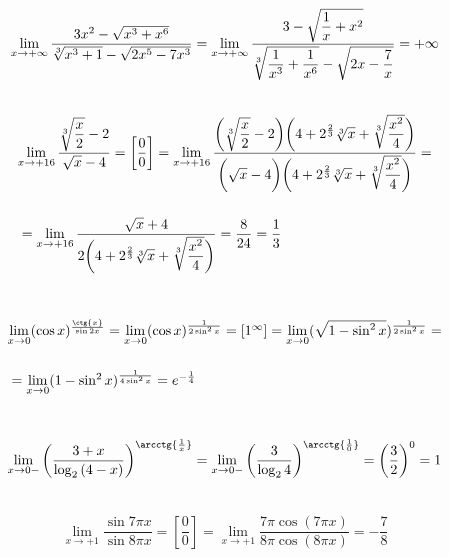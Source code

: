 \documentclass[12pt]{article}
\begin{document}
	\\
	$$
	\begin{array}{l}
		\lim\limits_{x\rightarrow+\infty} \dfrac{3x^2-\sqrt{x^3+x^6}}{\sqrt[3]{x^3+1}-\sqrt{2x^5-7x^3}}=\lim\limits_{x\rightarrow+\infty} \dfrac{3-\sqrt{\dfrac{1}{x}+x^2}}{\sqrt[3]{\dfrac{1}{x^3}+\dfrac{1}{x^6}}-\sqrt{2x-\dfrac{7}{x}}}=+\infty
		\\ \medskip{}{}
	\end{array}
	$$
	$$
	\begin{array}{l} 
		\lim\limits_{x\rightarrow+16} \dfrac{\sqrt[3]{\dfrac{x}{2}}-2}{\sqrt{x}-4} = \left[\dfrac{0}{0} \right]= \lim\limits_{x\rightarrow+16} \dfrac{\bigg(\sqrt[3]{\dfrac{x}{2}}-2 \bigg) \bigg(4+2^{\frac{2}{3}} \sqrt[3]{x}+\sqrt[3]{\dfrac{x^2}{4}}\bigg)}{\bigg(\sqrt{x}-4 \bigg) \bigg (4+2^{\frac{2}{3}} \sqrt[3]{x}+\sqrt[3]{\dfrac{x^2}{4}}\bigg )}=\\ \medskip{}{} \\ \medskip{}{} = \lim\limits_{x\rightarrow+16} \dfrac{\sqrt{x}+4}{2 \bigg (4+2^{\frac{2}{3}} \sqrt[3]{x}+\sqrt[3]{\dfrac{x^2}{4}} \bigg )}=\dfrac{8}{24}=\dfrac{1}{3}
	\end{array}
	$$
	\\
	$$
	\begin{array}{l}
		\lim\limits_{x\rightarrow0} (\cos{x})^{\frac{\ctg{x}}{\sin{2x}}}=\lim\limits_{x\rightarrow0} (\cos{x})^{\frac{1}{2\sin^2{x}}}=\left[1^{\infty}\right]=\lim\limits_{x\rightarrow0} (\sqrt{1-\sin^2{x}})^{\frac{1}{2\sin^2{x}}}=\\ \medskip{}{} \\ \medskip{}{}= \lim\limits_{x\rightarrow0} ({1-\sin^2{x}})^{\frac{1}{4\sin^2{x}}}=e^{-\frac{1}{4}}
	\end{array}
	$$
	\\
	$$
	\begin{array}{l}
		\lim\limits_{x\rightarrow0-} \left(\dfrac{3+x}{\log_2 {(4-x)}}\right)^{\arcctg{\frac{1}{x}}}= \lim\limits_{x\rightarrow0-} \left(\dfrac{3}{\log_2 {4}}\right)^{\arcctg{\frac{1}{0}}}= {\bigg(\dfrac{3}{2}\bigg)}^{0}=1
		\\ \medskip{}{}
	\end{array}
	$$
	$$
	\begin{array}{l}
		\lim\limits_{x\rightarrow+1} \dfrac{\sin{7 \pi x}}{\sin{8 \pi x}}=\left[\dfrac{0}{0} \right]=\lim\limits_{x\rightarrow+1} \dfrac{7 \pi \cos{(7 \pi x)}}{8 \pi \cos{(8 \pi x)}}=-\dfrac{7}{8}
	\end{array}
	$$
\end{document}
